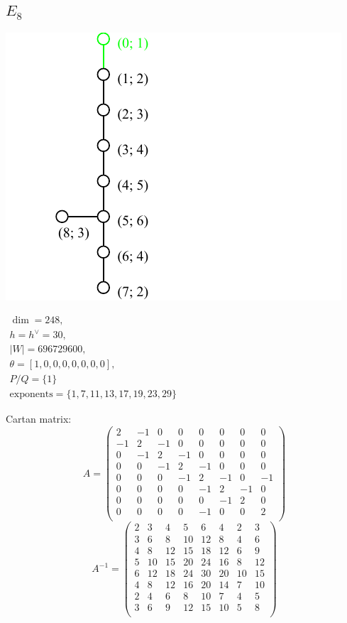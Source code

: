 \documentclass[12pt]{article}
\newcommand{\hc}{h^{\vee}}
\begin{document}
\subsection*{$E_8$}
\parbox{8cm}{\includegraphics{lie_E8.pdf}}
$
\begin{array}{l}
 \dim = 248, \\
  h=\hc= 30,\\
 |W|= 696729600,\\
 \theta=[1,0,0,0,0,0,0,0],\\
 P/Q=\{1\} \\
 \text{exponents}={\{1,7,11,13,17,19,23,29\}}
\end{array}
$

Cartan matrix:
\[
A=\left(
\begin{array}{cccccccc}
 2 &-1& 0& 0& 0& 0 & 0 &0   \\
 -1& 2&-1& 0& 0& 0 & 0 &0   \\
 0 &-1& 2&-1& 0& 0 & 0 & 0 \\
 0 &0 &-1& 2&-1& 0 & 0 & 0 \\
 0 &0 &0 &-1& 2&-1 & 0 & -1\\
 0 &0 &0 &0 &-1& 2 &-1 & 0 \\
 0 &0 &0 & 0 & 0&-1& 2 & 0\\
 0 &0 &0 & 0 &-1& 0& 0 & 2\\
\end{array}
\right)\]
\[
A^{-1}=
\left(
\begin{array}{cccccccc}
   2& 3& 4& 5& 6& 4& 2& 3\\
   3& 6& 8&10&12& 8& 4& 6\\
   4& 8&12&15&18&12& 6& 9\\
   5&10&15&20&24&16& 8&12\\
   6&12&18&24&30&20&10&15\\
   4& 8&12&16&20&14& 7&10\\
   2& 4& 6& 8&10& 7& 4& 5\\
   3& 6& 9&12&15&10& 5& 8\\
\end{array}
\right)
\]
\end{document}
